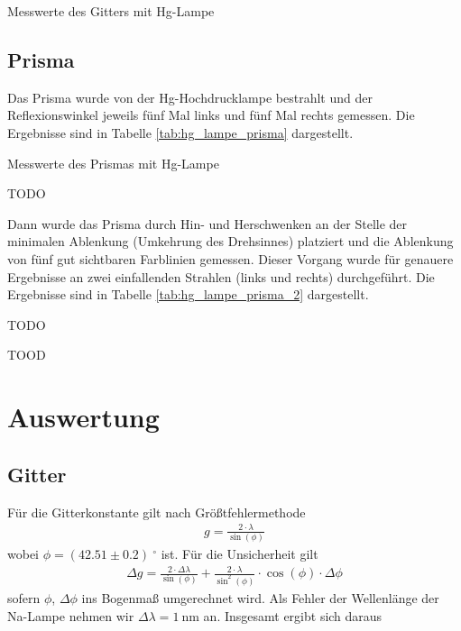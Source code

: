 \documentclass{article}
\begin{document}
\begin{table}[H]
\caption{Messwerte des Gitters mit Hg-Lampe}
\label{tab:hg_lampe}
\centering

\end{table}



\subsection{Prisma}

Das Prisma wurde von der Hg-Hochdrucklampe bestrahlt und der Reflexionswinkel jeweils fünf Mal links und fünf Mal rechts gemessen. Die Ergebnisse sind in Tabelle \ref{tab:hg_lampe_prisma} dargestellt.


\begin{table}[H]
\caption{Messwerte des Prismas mit Hg-Lampe}
\label{tab:hg_lampe_prisma}
\centering
TODO
%
\end{table}

Dann wurde das Prisma durch Hin- und Herschwenken an der Stelle der minimalen Ablenkung (Umkehrung des Drehsinnes) platziert und die Ablenkung von fünf gut sichtbaren Farblinien gemessen. Dieser Vorgang wurde für genauere Ergebnisse an zwei einfallenden Strahlen (links und rechts) durchgeführt. Die Ergebnisse sind in Tabelle \ref{tab:hg_lampe_prisma_2} dargestellt.

\begin{table}[H]
\caption{TODO}
\label{tab:hg_lampe_prisma_2}
\centering
TOOD
%
\end{table}


\section{Auswertung}

\subsection{Gitter}
Für die Gitterkonstante gilt nach Größtfehlermethode
\begin{align*}
g = \frac{2\cdot \lambda}{\sin(\phi)}
\end{align*}
 wobei $\phi = (42.51 \pm 0.2) ~^\circ$ ist. Für die Unsicherheit gilt
\begin{align*}
\Delta g = \frac{2\cdot\Delta \lambda}{\sin(\phi)} + \frac{2\cdot\lambda}{\sin^2(\phi)}\cdot \cos(\phi)\cdot \Delta\phi
\end{align*}
sofern $\phi$, $\Delta\phi$ ins Bogenmaß umgerechnet wird. Als Fehler der Wellenlänge der Na-Lampe nehmen wir $\Delta\lambda = 1~$nm an. Insgesamt ergibt sich daraus 

\end{document}

